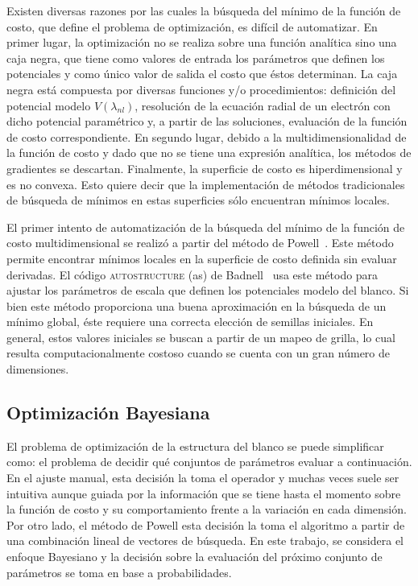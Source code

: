 Existen diversas razones por las cuales la búsqueda del mínimo de la 
función de costo, que define el problema de optimización, es difícil de 
automatizar. En primer lugar, la optimización no se realiza sobre una 
función analítica sino una caja negra, que tiene como valores de entrada 
los parámetros que definen los potenciales y como único valor de salida
el costo que éstos determinan. La caja negra está compuesta por diversas
funciones y/o procedimientos: definición del potencial modelo 
$V(\lambda_{nl})$, resolución de la ecuación radial de un electrón con 
dicho potencial paramétrico y, a partir de las soluciones, evaluación de 
la función de costo correspondiente.
En segundo lugar, debido a la multidimensionalidad de la función de 
costo y dado que no se tiene una expresión analítica, los métodos de 
gradientes se descartan. Finalmente, la superficie de costo es 
hiperdimensional y es no convexa. Esto quiere decir que la 
implementación de métodos tradicionales de búsqueda de mínimos en estas 
superficies sólo encuentran mínimos locales. 

El primer intento de automatización de la búsqueda del mínimo de la 
función de costo multidimensional se realizó a partir del método de 
Powell~\cite{Powell:64,NumRec:07}. Este método permite encontrar mínimos 
locales en la superficie de costo definida sin evaluar derivadas. El 
código \textsc{autostructure} (\acs{as}) de Badnell~\cite{Badnell:11} 
usa este método  para ajustar los parámetros de escala que definen los 
potenciales modelo del blanco. Si bien este método proporciona una buena 
aproximación en la búsqueda de un mínimo global, éste requiere una 
correcta elección de semillas iniciales. En general, estos valores 
iniciales se buscan a partir de un mapeo de grilla, lo cual resulta 
computacionalmente costoso cuando se cuenta con un gran número de 
dimensiones. 

\subsection{Optimización Bayesiana}
\label{sec:gaussianprocess}

El problema de optimización de la estructura del blanco se puede 
simplificar como: el problema de decidir qué conjuntos de parámetros 
evaluar a continuación. En el ajuste manual, esta decisión la toma el 
operador y muchas veces suele ser intuitiva aunque guiada por la 
información que se tiene hasta el momento sobre la función de costo y su 
comportamiento frente a la variación en cada dimensión. Por otro lado, 
el método de Powell esta decisión la toma el algoritmo a partir de una 
combinación lineal de vectores de búsqueda. En este trabajo, se 
considera el enfoque Bayesiano y la decisión sobre la evaluación del 
próximo conjunto de parámetros se toma en base a probabilidades. 

